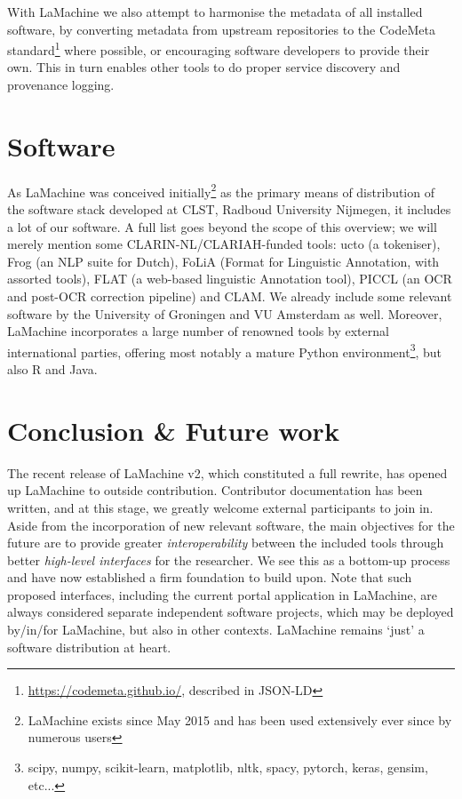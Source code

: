\documentclass[a4paper,11pt]{article}
\begin{document}
With LaMachine we also attempt to harmonise the metadata of all installed software, by converting metadata from upstream repositories to
the CodeMeta standard\footnote{\url{https://codemeta.github.io/}, described in JSON-LD} \cite{codemeta,codemetar} where possible, or encouraging software developers to provide
their own. This in turn enables other tools to do proper service discovery and provenance logging.

\section{Software}

As LaMachine was conceived initially\footnote{LaMachine exists since May 2015 and has been used extensively ever since by
numerous users} as the primary means of distribution of the software stack developed at CLST,
Radboud University Nijmegen, it includes a lot of our software. A full list goes beyond the scope of this overview; we
will merely mention some CLARIN-NL/CLARIAH-funded tools: ucto (a tokeniser), Frog (an NLP suite for Dutch), FoLiA (Format
for Linguistic Annotation, with assorted tools), FLAT (a web-based linguistic Annotation tool), PICCL (an OCR and
post-OCR correction pipeline) and CLAM. We already include some relevant software by the University of Groningen and VU
Amsterdam as well. Moreover, LaMachine incorporates a large number of renowned tools by external international parties,
offering most notably a mature Python environment\footnote{scipy, numpy, scikit-learn, matplotlib, nltk, spacy, pytorch,
keras, gensim, etc...}, but also R and Java.

\section{Conclusion \& Future work}

The recent release of LaMachine v2, which constituted a full rewrite, has opened up LaMachine to outside
contribution. Contributor documentation has been written, and at this stage, we greatly welcome external participants
to join in. Aside from the incorporation of new relevant software, the main objectives for the future are to provide
greater \emph{interoperability} between the included tools through better \emph{high-level interfaces} for the
researcher. We see this as a bottom-up process and have now established a firm foundation to build upon. Note that such
proposed interfaces, including the current portal application in LaMachine, are always considered separate independent
software projects, which may be deployed by/in/for LaMachine, but also in other contexts. LaMachine remains `just'
a software distribution at heart.
\end{document}
